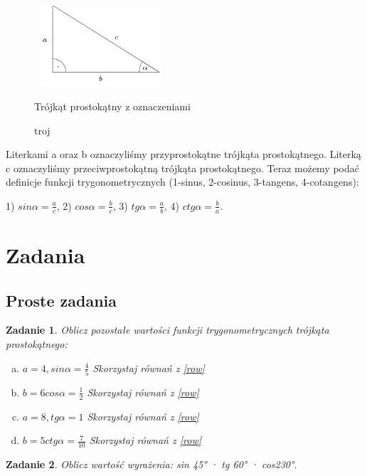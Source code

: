 \documentclass[12pt,a4paper]{article}
\newtheorem{zad}{Zadanie}[section]
\begin{document}
\begin{figure}
\centering
\includegraphics[width=5cm,height=3cm]{troj}
\caption{troj}{Trójkąt prostokątny z oznaczeniami}
\label{fig:obrazek troj}
\end{figure}


Literkami a oraz b oznaczyliśmy przyprostokątne trójkąta prostokątnego.
Literką c oznaczyliśmy przeciwprostokątną trójkąta prostokątnego.
Teraz możemy podać definicje funkcji trygonometrycznych (1-sinus, 2-cosinus, 3-tangens, 4-cotangens):

\begin{center}
\label{row}
1) $sinα=\frac{a}{c}$,
\label{row}
2) $cosα=\frac{b}{c}$,
\label{row}
3) $tgα=\frac{a}{b}$,
\label{row}
4) $ctgα=\frac{b}{a}$.

\end{center}

\cite{od1}


\newpage
\section{Zadania}

\subsection{Proste zadania}

\begin{zad}
Oblicz pozostałe wartości funkcji trygonometrycznych trójkąta prostokątnego:

\begin{enumerate}[a)]
\item $a=4 , sinα=\frac{4}{5}$ Skorzystaj równań z \ref{row}
\item $b=6 cosα=\frac{1}{2}$   Skorzystaj równań z \ref{row}
\item $a=8 ,tgα=1$             Skorzystaj równań z \ref{row}  
\item $b=5 ctgα=\frac{7}{10}$  Skorzystaj równań z \ref{row}
\end{enumerate}

\end{zad}

\begin{zad}
Oblicz wartość wyrażenia: sin 45° · tg 60° · cos230°.
\end{zad}
\end{document}
